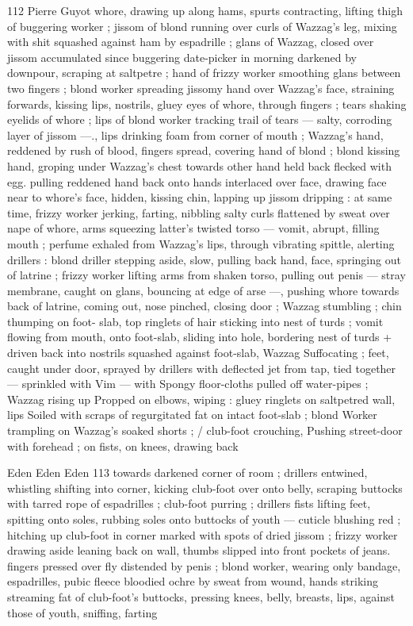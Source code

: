 112 Pierre Guyot
whore, drawing up along hams, spurts contracting, lifting thigh of
buggering worker ; jissom of blond running over curls of Wazzag's
leg, mixing with shit squashed against ham by espadrille ; glans of
Wazzag, closed over jissom accumulated since buggering date-picker
in morning darkened by downpour, scraping at saltpetre ; hand of
frizzy worker smoothing glans between two fingers ; blond worker
spreading jissomy hand over Wazzag's face, straining forwards,
kissing lips, nostrils, gluey eyes of whore, through fingers ; tears
shaking eyelids of whore ; lips of blond worker tracking trail of tears
— salty, corroding layer of jissom —., lips drinking foam from corner
of mouth ; Wazzag’s hand, reddened by rush of blood, fingers
spread, covering hand of blond ; blond kissing hand, groping under
Wazzag's chest towards other hand held back flecked with egg.
pulling reddened hand back onto hands interlaced over face, drawing
face near to whore's face, hidden, kissing chin, lapping up jissom
dripping : at same time, frizzy worker jerking, farting, nibbling salty
curls flattened by sweat over nape of whore, arms squeezing latter's
twisted torso — vomit, abrupt, filling mouth ; perfume exhaled from
Wazzag's lips, through vibrating spittle, alerting drillers : blond
driller stepping aside, slow, pulling back hand, face, springing out of
latrine ; frizzy worker lifting arms from shaken torso, pulling out
penis — stray membrane, caught on glans, bouncing at edge of arse
—, pushing whore towards back of latrine, coming out, nose
pinched, closing door ; Wazzag stumbling ; chin thumping on foot-
slab, top ringlets of hair sticking into nest of turds ; vomit flowing
from mouth, onto foot-slab, sliding into hole, bordering nest of turds
+ driven back into nostrils squashed against foot-slab, Wazzag
Suffocating ; feet, caught under door, sprayed by drillers with
deflected jet from tap, tied together — sprinkled with Vim — with
Spongy floor-cloths pulled off water-pipes ; Wazzag rising up
Propped on elbows, wiping : gluey ringlets on saltpetred wall, lips
Soiled with scraps of regurgitated fat on intact foot-slab ; blond
Worker trampling on Wazzag's soaked shorts ; / club-foot crouching,
Pushing street-door with forehead ; on fists, on knees, drawing back

Eden Eden Eden 113
towards darkened corner of room ; drillers entwined, whistling
shifting into corner, kicking club-foot over onto belly, scraping
buttocks with tarred rope of espadrilles ; club-foot purring ; drillers
fists lifting feet, spitting onto soles, rubbing soles onto buttocks of
youth — cuticle blushing red ; hitching up club-foot in corner
marked with spots of dried jissom ; frizzy worker drawing aside
leaning back on wall, thumbs slipped into front pockets of jeans.
fingers pressed over fly distended by penis ; blond worker, wearing
only bandage, espadrilles, pubic fleece bloodied ochre by sweat from
wound, hands striking streaming fat of club-foot's buttocks, pressing
knees, belly, breasts, lips, against those of youth, sniffing, farting

